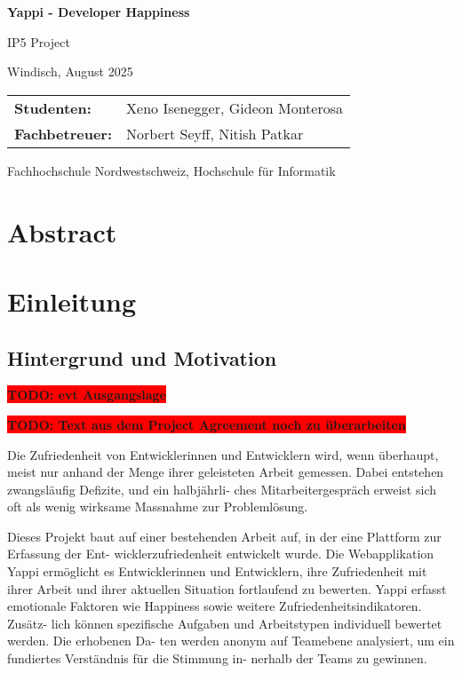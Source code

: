 \documentclass[12pt,a4paper]{report}
\newcommand{\todo}[1]{\colorbox{red}{\textbf{TODO: #1}}}
\begin{document}
\begin{titlepage}
    \centering
    {\huge \textbf{Yappi - Developer Happiness} \par}
    {\large IP5 Project \par}
    \vspace{0.5cm}
    {Windisch, August 2025 \par}
    \vspace{0.5cm}

    \begin{tabular}{@{}ll@{}}
        \textbf{Studenten:} & Xeno Isenegger, Gideon Monterosa \\
        \textbf{Fachbetreuer:} & Norbert Seyff, Nitish Patkar
    \end{tabular}

    \vfill
    {Fachhochschule Nordwestschweiz, Hochschule für Informatik \par}
\end{titlepage}

\chapter*{Abstract}
\newpage

\tableofcontents
\newpage

\listoffigures
\newpage

\listoftables
\newpage

\chapter{Einleitung}

\section{Hintergrund und Motivation}
\todo{evt Ausgangslage}

\todo{Text aus dem Project Agreement noch zu überarbeiten}

Die Zufriedenheit von Entwicklerinnen und Entwicklern wird, wenn überhaupt, meist nur anhand der
Menge ihrer geleisteten Arbeit gemessen. Dabei entstehen zwangsläufig Defizite, und ein halbjährli-
ches Mitarbeitergespräch erweist sich oft als wenig wirksame Massnahme zur Problemlösung.

Dieses Projekt baut auf einer bestehenden Arbeit auf, in der eine Plattform zur Erfassung der Ent-
wicklerzufriedenheit entwickelt wurde. Die Webapplikation Yappi ermöglicht es Entwicklerinnen und
Entwicklern, ihre Zufriedenheit mit ihrer Arbeit und ihrer aktuellen Situation fortlaufend zu bewerten.
Yappi erfasst emotionale Faktoren wie Happiness sowie weitere Zufriedenheitsindikatoren. Zusätz-
lich können spezifische Aufgaben und Arbeitstypen individuell bewertet werden. Die erhobenen Da-
ten werden anonym auf Teamebene analysiert, um ein fundiertes Verständnis für die Stimmung in-
nerhalb der Teams zu gewinnen.
\end{document}
